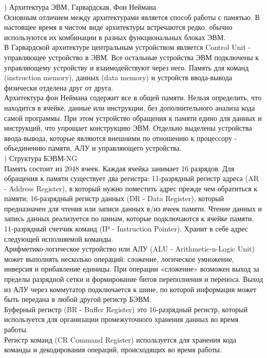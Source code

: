 ) Архитектура ЭВМ, Гарвардская, Фон Неймана \\
Основным отличием между архитектурами является способ работы с памятью. В настоящее время в чистом виде архитектуры встречаются редко, обычно используются их комбинации в разных функциональных блоках ЭВМ. \\
В Гарвардской архитектуре центральным устройством является Control Unit - управляющее устройство в ЭВМ. Все остальные устройства ЭВМ подключены к управляющему устройству и взаимодействуют через него. Память для команд (instruction memory), данных (data memory) и устройств ввода-вывода физически отделена друг от друга. \\
Архитектура фон Неймана содержит все в общей памяти. Нельзя определить, что находится в ячейке, данные или инструкции, без дополнительного анализа кода самой программы. При этом устройство обращения к памяти едино для данных и инструкций, что упрощает конструкцию ЭВМ. Отдельно выделены устройства ввода-вывода, которые являются внешними по отношению к процессору - объединению памяти, АЛУ и управляющего устройства. \\
\newpage
{}) Структура БЭВМ-NG \\
Память состоит из 2048 ячеек. Каждая ячейка занимает 16 разрядов. Для обращения к памяти существует два регистра: 11-разрядный регистр адреса (AR - Address Register), в который нужно поместить адрес прежде чем обратиться к памяти; 16-разрядный регистр данных (DR - Data Register), который предназначен для чтения или записи данных в/из ячеек памяти. Чтение данных и запись данных реализуется по шинам, которые подключаются к ячейке памяти. \\
11-разрядный счетчик команд (IP - Instruction Pointer). Хранит в себе адрес следующей исполняемой команды. \\
Арифметико-логическое устройство или АЛУ (ALU - Arithmetic-n-Logic Unit) может выполнять несколько операций: сложение, логическое умножение, инверсия и прибавление единицы. При операции «сложение» возможен выход за пределы разрядной сетки и формирование битов переполнения и переноса. Выход из АЛУ через коммутатор подключается к шине, по которой информация может быть передана в любой другой регистр БЭВМ. \\
Буферный регистр (BR - Buffer Register) это 16-разрядный регистр, который используется для организации промежуточного хранения данных во время работы. \\
Регистр команд (CR Command Register) используется для хранения кода команды и декодирования операций, происходящих во время работы. \\
